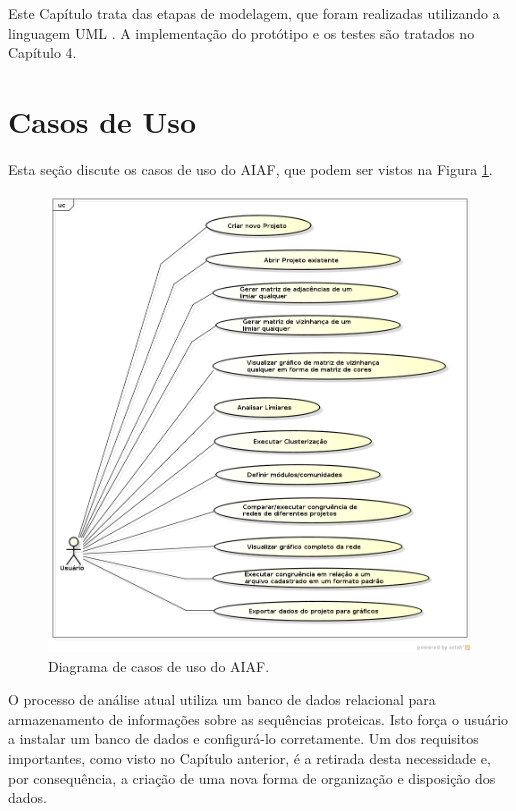 Este Capítulo trata das etapas de modelagem, que foram realizadas utilizando a linguagem UML \cite{uml}. A implementação do protótipo e os testes são
tratados no Capítulo 4.

\section{Casos de Uso} \label{sec:escopo}

Esta seção discute os casos de uso do AIAF, que podem ser vistos na Figura \ref{fig:casos-uso}.

\begin{figure}
\centering
\includegraphics[scale=0.52]{diagrama-casos-de-uso}
\caption{Diagrama de casos de uso do AIAF.}
\label{fig:casos-uso}
\end{figure}

O processo de análise atual utiliza um banco de dados relacional para armazenamento de informações
sobre as sequências proteicas. Isto força o usuário a instalar
um banco de dados e configurá-lo corretamente. Um dos requisitos importantes, como visto no Capítulo anterior, é a retirada desta necessidade e,
por consequência, a criação de uma nova forma de organização e disposição dos dados.

